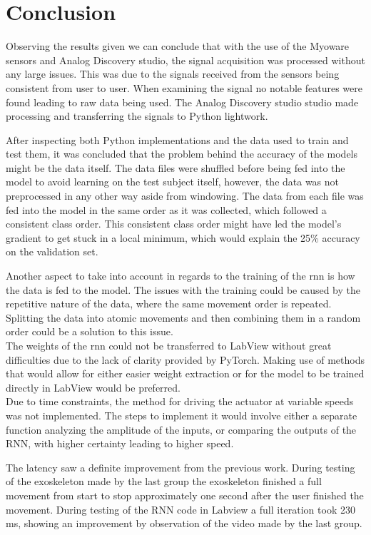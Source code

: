 \section{Conclusion}
Observing the results given we can conclude that with the use of the Myoware sensors and Analog Discovery studio, the signal 
acquisition was processed without any large issues. This was due to the signals received from the sensors being consistent 
from user to user. When examining the signal no notable features were found leading to raw data being used.
The Analog Discovery studio studio made processing and transferring the signals to Python lightwork.


After inspecting both Python implementations and the data used to train and test them, it was concluded that the problem behind the accuracy
of the models might be the data itself. The data files were shuffled before being fed into the model to avoid learning on the test subject
itself, however, the data was not preprocessed in any other way aside from windowing. The data from each file was fed into the model in the 
same order as it was collected, which followed a consistent class order. This consistent class order might have led the model's gradient to 
get stuck in a local minimum, which would explain the 25\% accuracy on the validation set.

Another aspect to take into account in regards to the training of the \acrshort{rnn} is how the data is fed to the model. The issues
with the training could be caused by the repetitive nature of the data, where the same movement order is repeated. Splitting the data
into atomic movements and then combining them in a random order could be a solution to this issue.
\\

The weights of the \acrshort{rnn} could not be transferred to LabView without great difficulties due to the lack of clarity provided by
PyTorch. Making use of methods that would allow for either easier weight extraction or for the model to be trained
directly in LabView would be preferred.
\\

Due to time constraints, the method for driving the actuator at variable speeds was not implemented. The steps to implement it
would involve either a separate function analyzing the amplitude of the inputs, or comparing the outputs of the RNN,
with higher certainty leading to higher speed.


The latency saw a definite improvement from the previous work. During testing of the exoskeleton made by the last group
the exoskeleton finished a full movement from start to stop approximately one second after the user finished the movement. 
During testing of the RNN code in Labview a full iteration took 230 ms, showing an improvement by observation of the video 
made by the last group. 


